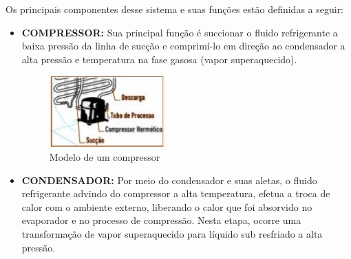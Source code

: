 	
	Os principais componentes desse sistema e suas funções estão definidas a seguir:
	
	\begin{itemize}
		\item  \textbf{COMPRESSOR:} Sua principal função é succionar o fluido refrigerante a baixa pressão da linha de sucção e comprimí-lo em direção ao condensador a alta pressão e temperatura na fase gasosa (vapor superaquecido).
			\begin{figure}[H]
				\begin{center}
					\includegraphics[scale =1]{figuras/Compressor}
					\caption{Modelo de um compressor}
				\end{center}
			\end{figure}	
		\item  \textbf{CONDENSADOR:} Por meio do condensador e suas aletas, o fluido refrigerante advindo do compressor a alta temperatura, efetua a troca de calor com o ambiente externo, liberando o calor que foi absorvido no evaporador e no processo de compressão. Nesta etapa, ocorre uma transformação de vapor superaquecido para líquido sub resfriado a alta pressão.
		

\end{itemize}
